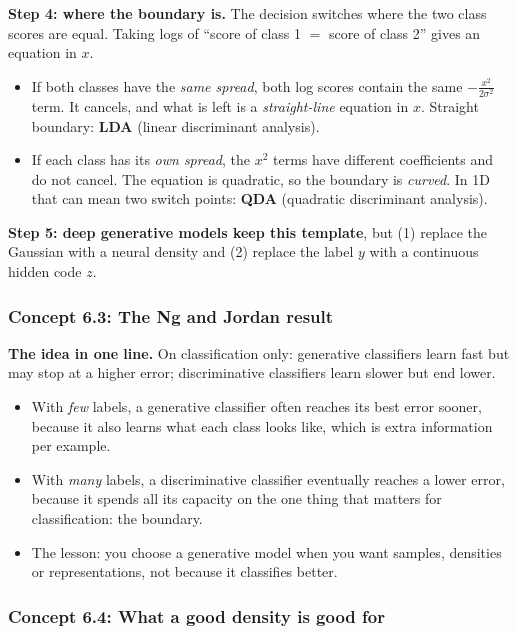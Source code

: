 \documentclass[12pt,a4paper]{article}
\begin{document}
\textbf{Step 4: where the boundary is.} The decision switches where the two class scores are equal. Taking logs of ``score of class 1 $=$ score of class 2'' gives an equation in $x$.
\begin{itemize}[nosep]
  \item If both classes have the \emph{same spread}, both log scores contain the same $-\frac{x^2}{2\sigma^2}$ term. It cancels, and what is left is a \emph{straight-line} equation in $x$. Straight boundary: \textbf{LDA} (linear discriminant analysis).
  \item If each class has its \emph{own spread}, the $x^2$ terms have different coefficients and do not cancel. The equation is quadratic, so the boundary is \emph{curved}. In 1D that can mean two switch points: \textbf{QDA} (quadratic discriminant analysis).
\end{itemize}

\textbf{Step 5: deep generative models keep this template}, but (1) replace the Gaussian with a neural density and (2) replace the label $y$ with a continuous hidden code $z$.

\subsubsection{Concept 6.3: The Ng and Jordan result}\label{c6-3}

\textbf{The idea in one line.} On classification only: generative classifiers learn fast but may stop at a higher error; discriminative classifiers learn slower but end lower.

\begin{itemize}[nosep]
  \item With \emph{few} labels, a generative classifier often reaches its best error sooner, because it also learns what each class looks like, which is extra information per example.
  \item With \emph{many} labels, a discriminative classifier eventually reaches a lower error, because it spends all its capacity on the one thing that matters for classification: the boundary.
  \item The lesson: you choose a generative model when you want samples, densities or representations, not because it classifies better.
\end{itemize}

\subsubsection{Concept 6.4: What a good density is good for}\label{c6-4}
\end{document}
